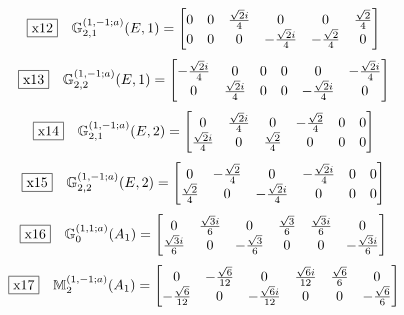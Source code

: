 \documentclass[fleqn,10pt,landscape]{jsarticle}
\begin{document}
\begin{dmath*}
\fbox{x12}\quad \mathbb{G}_{2,1}^{(1,-1;a)}(E,1)=\begin{bmatrix} 0 & 0 & \frac{\sqrt{2} i}{4} & 0 & 0 & \frac{\sqrt{2}}{4} \\ 0 & 0 & 0 & - \frac{\sqrt{2} i}{4} & - \frac{\sqrt{2}}{4} & 0 \end{bmatrix}
\end{dmath*}
\begin{dmath*}
\fbox{x13}\quad \mathbb{G}_{2,2}^{(1,-1;a)}(E,1)=\begin{bmatrix} - \frac{\sqrt{2} i}{4} & 0 & 0 & 0 & 0 & - \frac{\sqrt{2} i}{4} \\ 0 & \frac{\sqrt{2} i}{4} & 0 & 0 & - \frac{\sqrt{2} i}{4} & 0 \end{bmatrix}
\end{dmath*}
\begin{dmath*}
\fbox{x14}\quad \mathbb{G}_{2,1}^{(1,-1;a)}(E,2)=\begin{bmatrix} 0 & \frac{\sqrt{2} i}{4} & 0 & - \frac{\sqrt{2}}{4} & 0 & 0 \\ \frac{\sqrt{2} i}{4} & 0 & \frac{\sqrt{2}}{4} & 0 & 0 & 0 \end{bmatrix}
\end{dmath*}
\begin{dmath*}
\fbox{x15}\quad \mathbb{G}_{2,2}^{(1,-1;a)}(E,2)=\begin{bmatrix} 0 & - \frac{\sqrt{2}}{4} & 0 & - \frac{\sqrt{2} i}{4} & 0 & 0 \\ \frac{\sqrt{2}}{4} & 0 & - \frac{\sqrt{2} i}{4} & 0 & 0 & 0 \end{bmatrix}
\end{dmath*}
\begin{dmath*}
\fbox{x16}\quad \mathbb{G}_{0}^{(1,1;a)}(A_{1})=\begin{bmatrix} 0 & \frac{\sqrt{3} i}{6} & 0 & \frac{\sqrt{3}}{6} & \frac{\sqrt{3} i}{6} & 0 \\ \frac{\sqrt{3} i}{6} & 0 & - \frac{\sqrt{3}}{6} & 0 & 0 & - \frac{\sqrt{3} i}{6} \end{bmatrix}
\end{dmath*}
\begin{dmath*}
\fbox{x17}\quad \mathbb{M}_{2}^{(1,-1;a)}(A_{1})=\begin{bmatrix} 0 & - \frac{\sqrt{6}}{12} & 0 & \frac{\sqrt{6} i}{12} & \frac{\sqrt{6}}{6} & 0 \\ - \frac{\sqrt{6}}{12} & 0 & - \frac{\sqrt{6} i}{12} & 0 & 0 & - \frac{\sqrt{6}}{6} \end{bmatrix}
\end{dmath*}
\end{document}
